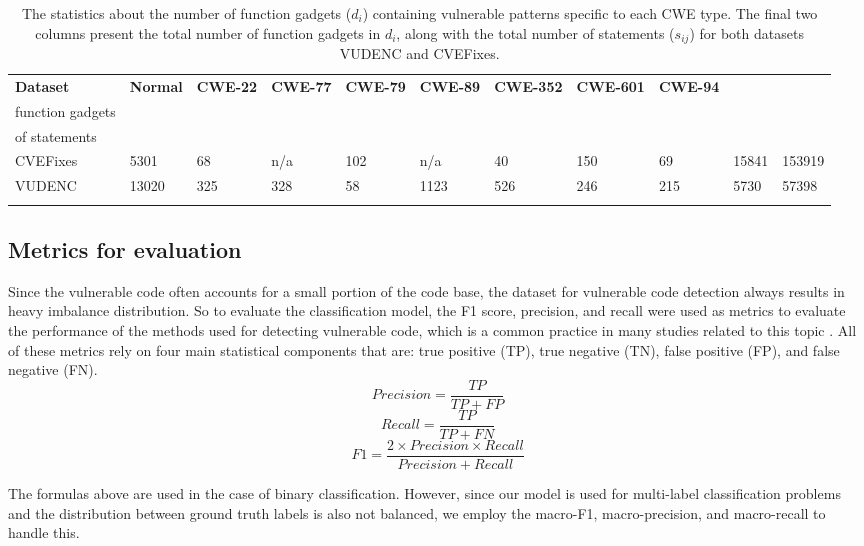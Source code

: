 \documentclass{ieeeaccess}
\begin{document}
 \begin{table}[h]
\centering
\begin{tabular}{lllllllllll}
\toprule
\Xhline{2\arrayrulewidth}
\textbf{Dataset} & \textbf{Normal} & \textbf{CWE-22} & \textbf{CWE-77} & \textbf{CWE-79} & \textbf{CWE-89} & \textbf{CWE-352} & \textbf{CWE-601} & \textbf{CWE-94} & \textbf{ \makecell{Total number  of \\ function gadgets }}
& \textbf{\makecell{Total number\\ of statements}}\\
\midrule
\hline
CVEFixes & 5301 & 68 & n/a & 102 & n/a & 40& 150 & 69 & 15841 & 153919\\
VUDENC & 13020 &325 & 328 & 58 & 1123 & 526& 246& 215 & 5730 & 57398\\
\Xhline{2\arrayrulewidth}
\bottomrule
\end{tabular}
\label{table:data_stat}
\caption{The statistics about the number of function gadgets ($d_i$) containing vulnerable patterns specific to each CWE type. The final two columns present the total number of function gadgets in $d_i$, along with the total number of statements ($s_{ij}$) for both datasets VUDENC and CVEFixes.}
\end{table}
\subsection{Metrics for evaluation}\label{sec:metrics}

\par Since the vulnerable code often accounts for a small portion of the code base, the dataset for vulnerable code detection always results in heavy imbalance distribution. So to evaluate the classification model, the F1 score, precision, and recall were used as metrics to evaluate the performance of the methods used for detecting vulnerable code, which is a common practice in many studies related to this topic \cite{Linevd,MVD}. All of these metrics rely on four main statistical components that are: true positive (TP), true negative (TN), false positive (FP), and false negative (FN). 
\begin{equation}\label{equa:metric1}Precision= \frac{TP}{TP+FP}\end{equation}
\begin{equation}\label{equa:metric2}Recall=\frac{TP}{TP+FN}\end{equation}
\begin{equation}\label{equa:metric3}F1=\frac{2 \times Precision \times Recall}{Precision + Recall}\end{equation}
\par The formulas above are used in the case of binary classification.  However, since our model is used for multi-label classification problems and the distribution between ground truth labels is also not balanced, we employ the macro-F1, macro-precision, and macro-recall to handle this. 
\end{document}
